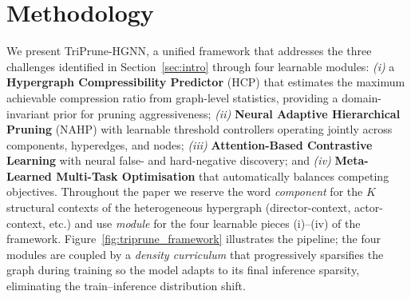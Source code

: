 \documentclass[10pt]{article}
\theoremstyle{plain}
\theoremstyle{definition}
\begin{document}
\section{Methodology}
\label{sec:methodology}
We present TriPrune-HGNN, a unified framework that addresses the three challenges identified in Section~\ref{sec:intro} through four learnable modules: \emph{(i)} a \textbf{Hypergraph Compressibility Predictor} (HCP) that estimates the maximum achievable compression ratio from graph-level statistics, providing a domain-invariant prior for pruning aggressiveness; \emph{(ii)} \textbf{Neural Adaptive Hierarchical Pruning} (NAHP) with learnable threshold controllers operating jointly across components, hyperedges, and nodes; \emph{(iii)} \textbf{Attention-Based Contrastive Learning} with neural false- and hard-negative discovery; and \emph{(iv)} \textbf{Meta-Learned Multi-Task Optimisation} that automatically balances competing objectives. Throughout the paper we reserve the word \emph{component} for the $K$ structural contexts of the heterogeneous hypergraph (director-context, actor-context, etc.) and use \emph{module} for the four learnable pieces (i)--(iv) of the framework. Figure~\ref{fig:triprune_framework} illustrates the pipeline; the four modules are coupled by a \emph{density curriculum} that progressively sparsifies the graph during training so the model adapts to its final inference sparsity, eliminating the train--inference distribution shift.
\end{document}
